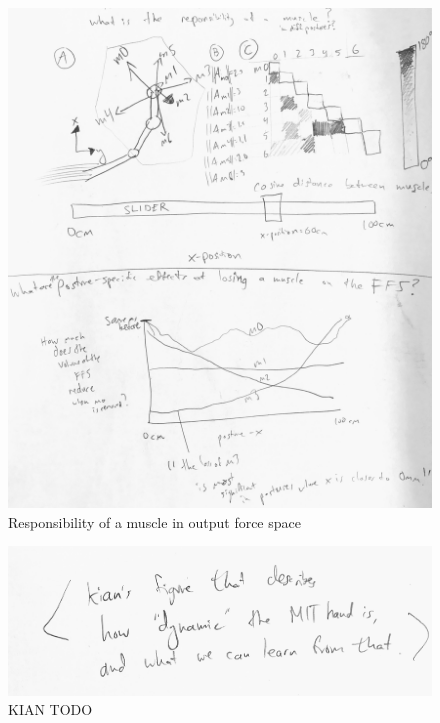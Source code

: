 \documentclass[utf8]{frontiersSCNS} %
\begin{document}
\begin{figure}[h!]
\begin{center}
\includegraphics[width=17.5cm]{figures/responsibility_of_a_muscle/responsibility_of_a_muscle.jpg}%
\end{center}
\caption{Responsibility of a muscle in output force space }
\label{fig:responsibility_of_a_muscle}
\end{figure}

\begin{figure}[h!]
\begin{center}
\includegraphics[width=17.5cm]{figures/dynamics_vs_statics/dynamics_vs_statics.jpg}%
\end{center}
\caption{KIAN TODO}
\label{fig:dynamics_vs_statics}
\end{figure}


\end{document}
